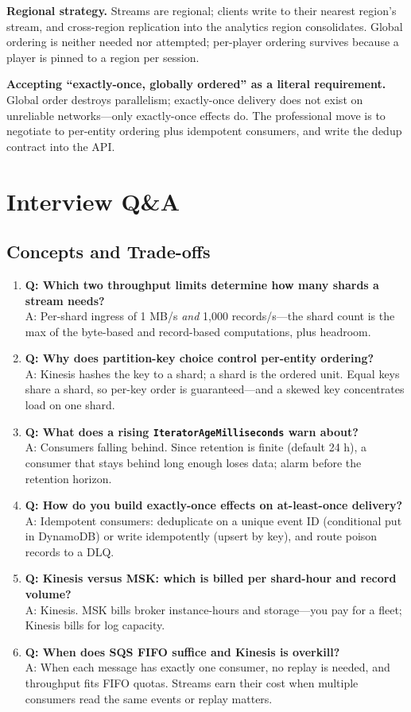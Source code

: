 \textbf{Regional strategy.} Streams are regional; clients write to their nearest region's stream, and cross-region replication into the analytics region consolidates. Global ordering is neither needed nor attempted; per-player ordering survives because a player is pinned to a region per session.

\begin{pitfall}
\textbf{Accepting ``exactly-once, globally ordered'' as a literal requirement.} Global order destroys parallelism; exactly-once delivery does not exist on unreliable networks---only exactly-once effects do. The professional move is to negotiate to per-entity ordering plus idempotent consumers, and write the dedup contract into the API.
\end{pitfall}

\section{Interview Q\&A}
\subsection{Concepts and Trade-offs}
\begin{enumerate}
    \item \textbf{Q: Which two throughput limits determine how many shards a stream needs?}\\
    A: Per-shard ingress of 1 MB/s \emph{and} 1{,}000 records/s---the shard count is the max of the byte-based and record-based computations, plus headroom.
    \item \textbf{Q: Why does partition-key choice control per-entity ordering?}\\
    A: Kinesis hashes the key to a shard; a shard is the ordered unit. Equal keys share a shard, so per-key order is guaranteed---and a skewed key concentrates load on one shard.
    \item \textbf{Q: What does a rising \texttt{IteratorAgeMilliseconds} warn about?}\\
    A: Consumers falling behind. Since retention is finite (default 24 h), a consumer that stays behind long enough loses data; alarm before the retention horizon.
    \item \textbf{Q: How do you build exactly-once effects on at-least-once delivery?}\\
    A: Idempotent consumers: deduplicate on a unique event ID (conditional put in DynamoDB) or write idempotently (upsert by key), and route poison records to a DLQ.
    \item \textbf{Q: Kinesis versus MSK: which is billed per shard-hour and record volume?}\\
    A: Kinesis. MSK bills broker instance-hours and storage---you pay for a fleet; Kinesis bills for log capacity.
    \item \textbf{Q: When does SQS FIFO suffice and Kinesis is overkill?}\\
    A: When each message has exactly one consumer, no replay is needed, and throughput fits FIFO quotas. Streams earn their cost when multiple consumers read the same events or replay matters.
\end{enumerate}

